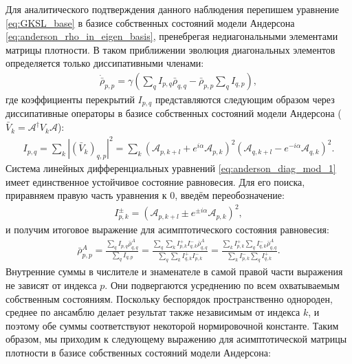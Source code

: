 Для аналитического подтверждения данного наблюдения перепишем уравнение \cref{eq:GKSL_base} в базисе собственных состояний модели Андерсона \cref{eq:anderson_rho_in_eigen_basis}, пренебрегая недиагональными элементами матрицы плотности. В таком приближении эволюция диагональных элементов определяется только диссипативными членами:
\begin{equation}
\label{eq:anderson_diag_mod_1}
\begin{gathered}
\dot{\bar{\rho}}_{p,p} = \gamma \left( \sum_q I_{p,q}\bar{\rho}_{q,q} - \bar{\rho}_{p,p} \sum_q I_{q,p} \right),
\end{gathered}
\end{equation}
где коэффициенты перекрытий \(I_{p,q}\) представляются следующим образом через диссипативные операторы в базисе собственных состояний модели Андерсона (\(\bar{V}_k = \mathcal{A}^\dagger V_k \mathcal{A}\)):
\begin{equation}
\label{eq:anderson_diag_mod_2}
\begin{gathered}
I_{p,q} = \sum_k \left| \left(\bar{V}_k\right)_{q,p} \right|^2 = \sum_k \left(\mathcal{A}_{p, k+l} + e^{i \alpha} \mathcal{A}_{p, k} \right)^2  \left(\mathcal{A}_{q, k+l} - e^{-i \alpha} \mathcal{A}_{q, k} \right)^2.
\end{gathered}
\end{equation}
Система линейных дифференциальных уравнений \cref{eq:anderson_diag_mod_1} имеет единственное устойчивое состояние равновесия. Для его поиска, приравняем правую часть уравнения к \(0\), введём переобозначение:
\begin{equation}
\label{eq:anderson_diag_mod_3}
\begin{gathered}
I^{\pm}_{p,k} = \left(\mathcal{A}_{p, k+l} \pm e^{\pm i \alpha} \mathcal{A}_{p, k} \right)^2 ,
\end{gathered}
\end{equation}
и получим итоговое выражение для асимптотического состояния равновесия:
\begin{equation}
\label{eq:anderson_diag_mod_4}
\begin{gathered}
\bar{\rho}^A_{p,p} = \frac{\sum_q I_{p,q}\bar{\rho}^A_{q,q}}{\sum_q I_{q,p}} = \frac{\sum_q \sum_k I^{+}_{p,k} I^{-}_{q,k} \bar{\rho}^A_{q,q}}{\sum_q \sum_k I^{+}_{q,k}  I^{-}_{p,k}} = \frac{\sum_k I^{+}_{p,k} \sum_q I^{-}_{q,k} \bar{\rho}^A_{q,q}}{ \sum_k I^{-}_{p,k} \sum_q  I^{+}_{q,k} } .
\end{gathered}
\end{equation}
Внутренние суммы в числителе и знаменателе в самой правой части выражения не зависят от индекса \(p\). Они подвергаются усреднению по всем охватываемым собственным состояниям. Поскольку беспорядок пространственно однороден, среднее по ансамблю делает результат также независимым от индекса \(k\), и поэтому обе суммы соответствуют некоторой нормировочной константе. Таким образом, мы приходим к следующему выражению для асимптотической матрицы плотности в базисе собственных состояний модели Андерсона:

